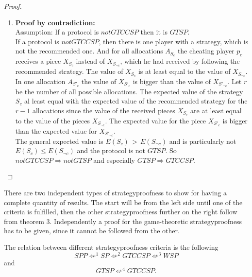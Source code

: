 \begin{proof}
\begin{enumerate}
\item \textbf{Proof by contradiction:}\\
\newline
Assumption: If a protocol is $notGTCCSP$ then it is $GTSP$.\\
If a protocol is $notGTCCSP$, then there is one player with a strategy, which is not the recommended one. And for all allocations $A_{S_c}$ the cheating player $p_c$ receives a piece $X_{S_c}$ instead of $X_{S_{\neg c}}$, which he had received by following the recommended strategy. The value of $X_{S_c}$ is at least equal to the value of $X_{S_{\neg c}}$. In one allocation $A_{S'_c}$ the value of $X_{S'_c}$ is bigger than the value of $X_{S'_{\neg c}}$. Let $r$ be the number of all possible allocations. The expected value of the strategy ${S_c}$ al least equal with the expected value of the recommended strategy for the $r-1$ allocations since the value of the received pieces $X_{S_c}$ are at least equal to the value of the pieces $X_{S_{\neg c}}$. The expected value for the piece $X_{S'_c}$ is bigger than the expected value for $X_{S'_{\neg c}}$. \\
The general expected value is $E(S_c)\:\:$>$\:\:E(S_{\neg c})$ and is particularly not $E(S_c)\leq E(S_{\neg c})$ and the protocol is not $GTSP$. \blitza 
\newline
\newline
So $notGTCCSP \Rightarrow notGTSP$ and especially $GTSP \Rightarrow GTCCSP$.
\end{enumerate}
\end{proof}
There are two independent types of strategyproofness to show for having a complete quantity of results. The start will be from the left side until one of the criteria is fulfilled, then the other strategyproofness further on the right follow from theorem 3. Independently a proof for the game-theoretic strategyproofness has to be given, since it cannot be followed from the other.  
\begin{lem} The relation between different strategyproofness criteria is the following $$SPP \not\Leftarrow^{1} SP \not\Leftarrow^{2} GTCCSP \not\Leftarrow^{3} WSP$$ and
$$GTSP \not\Leftarrow^{4} GTCCSP.$$
\end{lem}
